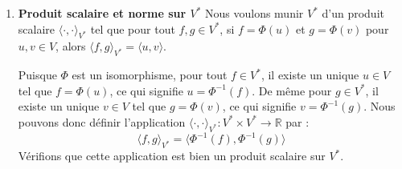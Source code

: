 \documentclass[11pt,a4paper]{report}
\begin{document}
\begin{enumerate}
  En conclusion, \(\Phi\) est un isomorphisme linéaire.
\item
  \textbf{Produit scalaire et norme sur \(V^*\)} Nous voulons munir
  \(V^*\) d'un produit scalaire \(\langle \cdot, \cdot \rangle_{V^*}\)
  tel que pour tout \(f, g \in V^*\), si \(f = \Phi(u)\) et
  \(g = \Phi(v)\) pour \(u, v \in V\), alors
  \(\langle f, g \rangle_{V^*} = \langle u, v \rangle\).

  Puisque \(\Phi\) est un isomorphisme, pour tout \(f \in V^*\), il
  existe un unique \(u \in V\) tel que \(f = \Phi(u)\), ce qui signifie
  \(u = \Phi^{-1}(f)\). De même pour \(g \in V^*\), il existe un unique
  \(v \in V\) tel que \(g = \Phi(v)\), ce qui signifie
  \(v = \Phi^{-1}(g)\). Nous pouvons donc définir l'application
  \(\langle \cdot, \cdot \rangle_{V^*}: V^* \times V^* \to \mathbb{R}\)
  par :
  \[ \langle f, g \rangle_{V^*} = \langle \Phi^{-1}(f), \Phi^{-1}(g) \rangle \]
  Vérifions que cette application est bien un produit scalaire sur
  \(V^*\).


\end{enumerate}
\end{document}
